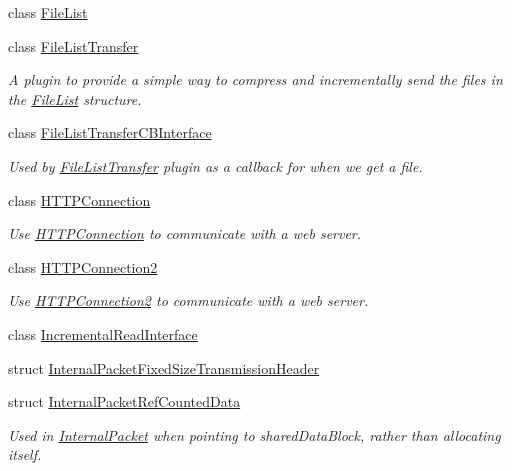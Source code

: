 \begin{DoxyCompactItemize}
class \hyperlink{class_rak_net_1_1_file_list}{File\-List}
\item 
class \hyperlink{class_rak_net_1_1_file_list_transfer}{File\-List\-Transfer}
\begin{DoxyCompactList}\small\item\em A plugin to provide a simple way to compress and incrementally send the files in the \hyperlink{class_rak_net_1_1_file_list}{File\-List} structure. \end{DoxyCompactList}\item 
class \hyperlink{class_rak_net_1_1_file_list_transfer_c_b_interface}{File\-List\-Transfer\-C\-B\-Interface}
\begin{DoxyCompactList}\small\item\em Used by \hyperlink{class_rak_net_1_1_file_list_transfer}{File\-List\-Transfer} plugin as a callback for when we get a file. \end{DoxyCompactList}\item 
class \hyperlink{class_rak_net_1_1_h_t_t_p_connection}{H\-T\-T\-P\-Connection}
\begin{DoxyCompactList}\small\item\em Use \hyperlink{class_rak_net_1_1_h_t_t_p_connection}{H\-T\-T\-P\-Connection} to communicate with a web server. \end{DoxyCompactList}\item 
class \hyperlink{class_rak_net_1_1_h_t_t_p_connection2}{H\-T\-T\-P\-Connection2}
\begin{DoxyCompactList}\small\item\em Use \hyperlink{class_rak_net_1_1_h_t_t_p_connection2}{H\-T\-T\-P\-Connection2} to communicate with a web server. \end{DoxyCompactList}\item 
class \hyperlink{class_rak_net_1_1_incremental_read_interface}{Incremental\-Read\-Interface}
\item 
struct \hyperlink{struct_rak_net_1_1_internal_packet_fixed_size_transmission_header}{Internal\-Packet\-Fixed\-Size\-Transmission\-Header}
\item 
struct \hyperlink{struct_rak_net_1_1_internal_packet_ref_counted_data}{Internal\-Packet\-Ref\-Counted\-Data}
\begin{DoxyCompactList}\small\item\em Used in \hyperlink{struct_rak_net_1_1_internal_packet}{Internal\-Packet} when pointing to shared\-Data\-Block, rather than allocating itself. \end{DoxyCompactList}\item 

\end{DoxyCompactItemize}

